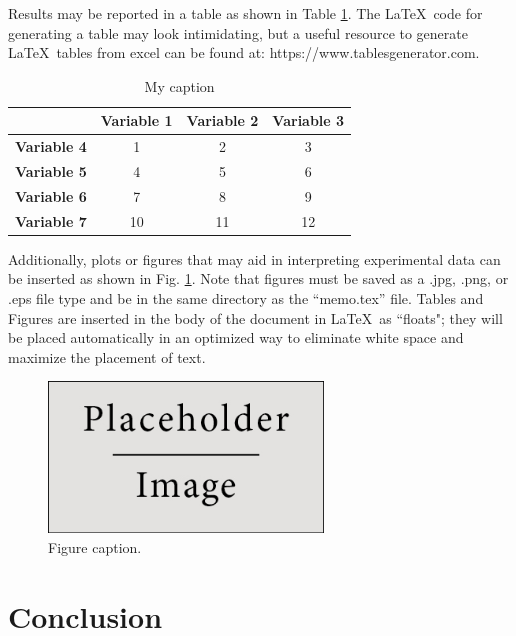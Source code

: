 \documentclass[12pt,letterpaper]{article}
\begin{document}
Results may be reported in a table as shown in Table \ref{table_lable}.  The \LaTeX\ code for generating a table may look intimidating, but a useful resource to generate \LaTeX\ tables from excel can be found at: https://www.tablesgenerator.com.
\begin{table}[ht]
\centering
\caption{My caption}
\label{table_lable}
\begin{tabular}{c|ccc}
  & \textbf{Variable 1} & \textbf{Variable 2} & \textbf{Variable 3} \\
 \hline
\textbf{Variable 4} & 1 & 2 & 3 \\
\textbf{Variable 5} & 4 & 5 & 6 \\
\textbf{Variable 6} & 7 & 8 & 9 \\
\textbf{Variable 7} & 10 & 11 & 12
\end{tabular}
\end{table}
Additionally, plots or figures that may aid in interpreting experimental data can be inserted as shown in Fig. \ref{placeholderFigure}. Note that figures must be saved as a .jpg, .png, or .eps file type and be in the same directory as the ``memo.tex'' file.  Tables and Figures are inserted in the body of the document in \LaTeX\ as ``floats"; they will be placed automatically in an optimized way to eliminate white space and maximize the placement of text.
\begin{figure}[ht]
\begin{center}
	\includegraphics[width=0.65\textwidth]{placeholder} %
	\caption{Figure caption.}
	\label{placeholderFigure}
\end{center}
\end{figure}	



\section{Conclusion}
\end{document}
